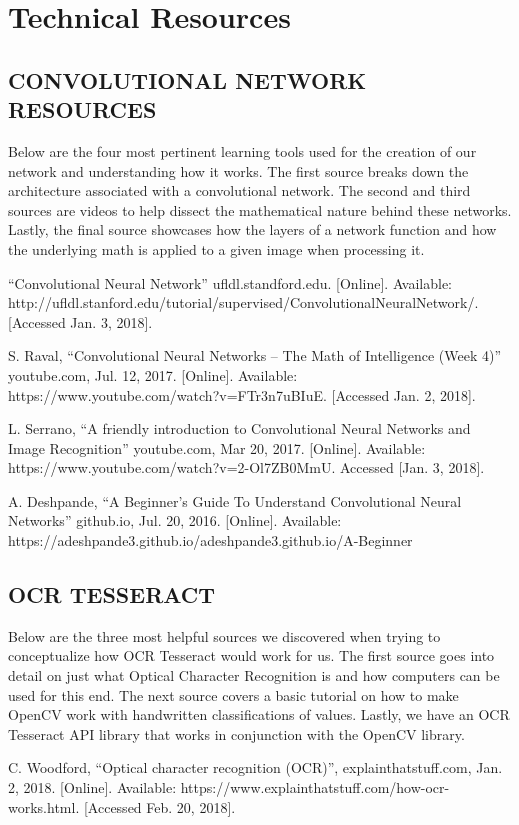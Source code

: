 \documentclass[article, onecolumn, draftclsnofoot,10pt, compsoc]{IEEEtran}
\begin{document}
\section{Technical Resources}
\subsection{CONVOLUTIONAL NETWORK RESOURCES}
Below are the four most pertinent learning tools used for the creation of our network and understanding how it works. The first source breaks down the architecture associated with a convolutional network. The second and third sources are videos to help dissect the mathematical nature behind these networks. Lastly, the final source showcases how the layers of a network function and how the underlying math is applied to a given image when processing it.

“Convolutional Neural Network” ufldl.standford.edu. [Online]. Available: http://ufldl.stanford.edu/tutorial/supervised/ConvolutionalNeuralNetwork/. [Accessed Jan. 3, 2018].

S. Raval, “Convolutional Neural Networks – The Math of Intelligence (Week 4)” youtube.com, Jul. 12, 2017. [Online]. Available: https://www.youtube.com/watch?v=FTr3n7uBIuE. [Accessed Jan. 2, 2018].

L. Serrano, “A friendly introduction to Convolutional Neural Networks and Image Recognition” youtube.com, Mar 20, 2017. [Online]. Available: https://www.youtube.com/watch?v=2-Ol7ZB0MmU. Accessed [Jan. 3, 2018].

A. Deshpande, “A Beginner’s Guide To Understand Convolutional Neural Networks” github.io, Jul. 20, 2016. [Online]. Available: https://adeshpande3.github.io/adeshpande3.github.io/A-Beginner%

\subsection{OCR TESSERACT}
Below are the three most helpful sources we discovered when trying to conceptualize how OCR Tesseract would work for us. The first source goes into detail on just what Optical Character Recognition is and how computers can be used for this end. The next source covers a basic tutorial on how to make OpenCV work with handwritten classifications of values. Lastly, we have an OCR Tesseract API library that works in conjunction with the OpenCV library. 

C. Woodford, “Optical character recognition (OCR)”, explainthatstuff.com, Jan. 2, 2018. [Online]. Available: https://www.explainthatstuff.com/how-ocr-works.html. [Accessed Feb. 20, 2018].
\end{document}
